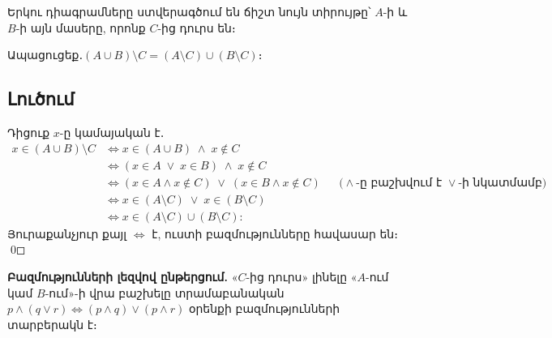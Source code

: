 \documentclass[12pt, a4paper]{article}
\begin{document}
\begin{theorybox}
\begin{center}
\end{center}
Երկու դիագրամները ստվերագծում են ճիշտ նույն տիրույթը՝ $A$-ի և $B$-ի այն մասերը,
որոնք $C$-ից դուրս են։
\end{theorybox}

\begin{problembox}
Ապացուցեք․\quad $(A \cup B) \setminus C = (A \setminus C) \cup (B \setminus C)$։
\end{problembox}

\subsection*{Լուծում}

Դիցուք $x$-ը կամայական է․
\begin{align*}
  x \in (A \cup B) \setminus C
  &\iff x \in (A \cup B) \;\land\; x \notin C \\
  &\iff (x \in A \;\lor\; x \in B) \;\land\; x \notin C \\
  &\iff (x \in A \land x \notin C)
        \;\lor\; (x \in B \land x \notin C)
        && \text{($\land$-ը բաշխվում է $\lor$-ի նկատմամբ)} \\
  &\iff x \in (A \setminus C) \;\lor\; x \in (B \setminus C) \\
  &\iff x \in (A \setminus C) \cup (B \setminus C):
\end{align*}
Յուրաքանչյուր քայլ $\iff$ է, ուստի բազմությունները հավասար են։ \qed

\smallskip
\textbf{Բազմությունների լեզվով ընթերցում.}\; «$C$-ից դուրս» լինելը «$A$-ում կամ $B$-ում»-ի վրա բաշխելը տրամաբանական $p \land (q \lor r) \iff (p \land q) \lor (p \land r)$ օրենքի բազմությունների տարբերակն է։
\end{document}
